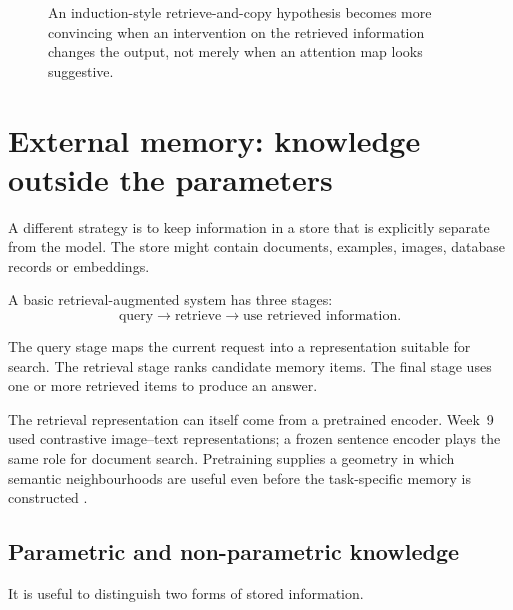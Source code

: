\begin{figure}[ht]
  \caption{An induction-style retrieve-and-copy hypothesis becomes more convincing when an intervention on the retrieved information changes the output, not merely when an attention map looks suggestive.}
  \label{fig:week11-induction}
\end{figure}

\section{External memory: knowledge outside the parameters}

A different strategy is to keep information in a store that is explicitly separate from the model. The store might contain documents, examples, images, database records or embeddings.

A basic retrieval-augmented system has three stages:
\begin{equation}
  \text{query} \longrightarrow \text{retrieve} \longrightarrow \text{use retrieved information}.
  \label{eq:week11-rag-pipeline}
\end{equation}

The query stage maps the current request into a representation suitable for search. The retrieval stage ranks candidate memory items. The final stage uses one or more retrieved items to produce an answer.

The retrieval representation can itself come from a pretrained encoder. Week~9 used contrastive image--text representations; a frozen sentence encoder plays the same role for document search. Pretraining supplies a geometry in which semantic neighbourhoods are useful even before the task-specific memory is constructed \parencite{radford2021clip}.

\subsection{Parametric and non-parametric knowledge}

It is useful to distinguish two forms of stored information.

